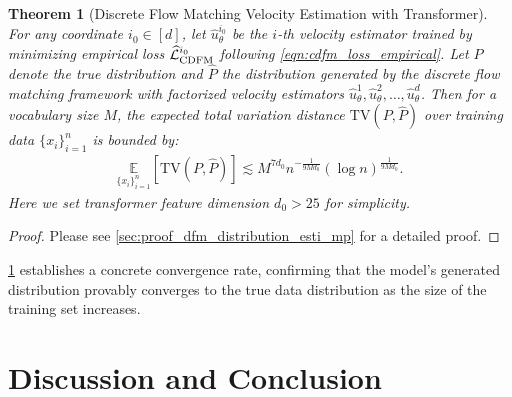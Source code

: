 \documentclass[12pt]{article}
\numberwithin{equation}{section}
\let\hat\widehat
\newcommand{\wh}{\widehat}
\renewcommand{\hat}{\wh}
\DeclareMathOperator*{\E}{{\mathbb{E}}}
\def\E{\mathbb{E}}
\theoremstyle{theoremstyle}
\newtheorem{theorem}{Theorem}[section]
\numberwithin{equation}{section}
\numberwithin{theorem}{section}
\numberwithin{proposition}{section}
\numberwithin{definition}{section}
\numberwithin{lemma}{section}
\numberwithin{assumption}{section}
\numberwithin{remark}{section}
\begin{document}
\begin{theorem}[Discrete Flow Matching Velocity Estimation with Transformer]
\label{thm:main_proof_distribution_estimation_extension_mixture_path}
For any coordinate $i_0\in[d]$, let $\hat{u}^{i_0}_\theta$  be the $i$-th velocity estimator trained by minimizing empirical loss $\hat{\mathcal{L}}^{i_0}_{\rm CDFM}$ following \eqref{eqn:cdfm_loss_empirical}.
Let $P$ denote the true distribution and $\hat{P}$ the distribution generated by the discrete flow matching framework with factorized velocity estimators $\hat{u}^{1}_\theta, \hat{u}^{2}_\theta, \ldots, \hat{u}^{d}_\theta$.
Then for a vocabulary size $M$, the expected total variation distance $\text{TV}(P,\hat{P})$ over training data $\{x_i\}_{i=1}^n$ is bounded by:
\begin{align*}
    \underset{\{x_i\}_{i=1}^n}
    {\E}[\text{TV}(P,\hat{P})]
    \lesssim 
    M^{7d_0} n^{-\frac{ 1}{9Md_0}}(\log n)^{\frac{1}{9Md_0}}.
\end{align*}
Here we set transformer feature dimension $d_0>25$ for simplicity.
\end{theorem}

\begin{proof}
    Please see \cref{sec:proof_dfm_distribution_esti_mp} for a detailed proof.
\end{proof}




\cref{thm:main_proof_distribution_estimation_extension_mixture_path} establishes a concrete convergence rate, confirming that the model's generated distribution provably converges to the true data distribution as the size of the training set increases.








\section{Discussion and Conclusion}
\label{sec:discussion}
\end{document}

